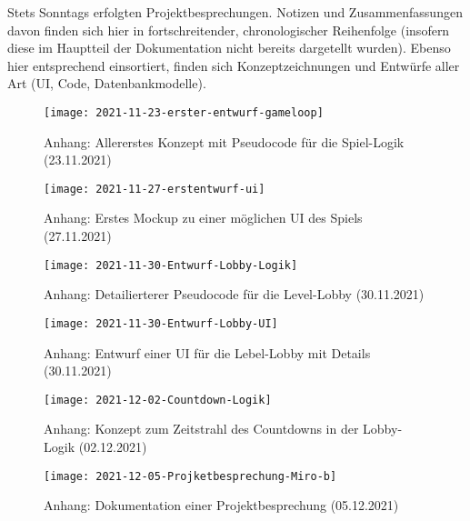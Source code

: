 Stets Sonntags erfolgten Projektbesprechungen. Notizen und Zusammenfassungen davon finden sich hier in fortschreitender, chronologischer Reihenfolge (insofern diese im Hauptteil der Dokumentation nicht bereits dargetellt wurden). Ebenso hier entsprechend einsortiert, finden sich Konzeptzeichnungen und Entwürfe aller Art (UI, Code, Datenbankmodelle).



\begin{figure}[H]
    \centering
    \caption{Anhang: Allererstes Konzept mit Pseudocode für die Spiel-Logik (23.11.2021)}
    \label{fig:2021-11-23-erster-entwurf-gameloop}
    \texttt{[image: 2021-11-23-erster-entwurf-gameloop]}
\end{figure}





\begin{figure}[H]
    \centering
    \caption{Anhang: Erstes Mockup zu einer möglichen UI des Spiels (27.11.2021)}
    \label{fig:2021-11-27-erstentwurf-ui}
    \texttt{[image: 2021-11-27-erstentwurf-ui]}
\end{figure}

\begin{figure}[H]
    \centering
    \caption{Anhang: Detailierterer Pseudocode für die Level-Lobby (30.11.2021)}
    \label{fig:2021-11-30-Entwurf-Lobby-Logik}
    \texttt{[image: 2021-11-30-Entwurf-Lobby-Logik]}
\end{figure}


\begin{figure}[H]
    \centering
    \caption{Anhang: Entwurf einer UI für die Lebel-Lobby mit Details (30.11.2021)}
    \label{fig:2021-11-30-Entwurf-Lobby-UI}
    \texttt{[image: 2021-11-30-Entwurf-Lobby-UI]}
\end{figure}


\begin{figure}[H]
    \centering
    \caption{Anhang: Konzept zum Zeitstrahl des Countdowns in der Lobby-Logik (02.12.2021)}
    \label{fig:2021-12-02-Countdown-Logik}
    \texttt{[image: 2021-12-02-Countdown-Logik]}
\end{figure}

 
\begin{figure}[H]
    \centering
    \caption{Anhang: Dokumentation einer Projektbesprechung (05.12.2021)}
    \label{fig:2021-12-05-Projketbesprechung-Miro-b}
    \texttt{[image: 2021-12-05-Projketbesprechung-Miro-b]}
\end{figure}







